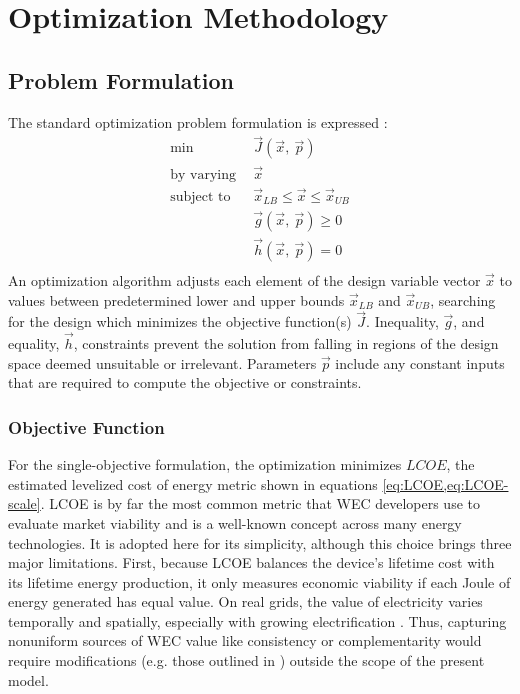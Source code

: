 \section{Optimization Methodology}\label{sec:optim-methods}
\subsection{Problem Formulation}\label{sec:formulation}
The standard optimization problem formulation is expressed \cite{martins_engineering_2022,papalambros_principles_2017}:
\begin{equation}
\begin{aligned}
    \text{min}~~& \vec{J}(\vec{x},~\vec{p}) \\
    \text{by varying}~~&\vec{x} \\
    \text{subject to}~~ &\vec{x}_{LB} \leq \vec{x} \leq \vec{x}_{UB} \\
    &\vec{g}(\vec{x},~\vec{p}) \geq 0\\
    &\vec{h}(\vec{x},~\vec{p})= 0\\
\label{standard}
\end{aligned}
\end{equation}
An optimization algorithm adjusts each element of the design variable vector $\vec{x}$ to values between predetermined lower and upper bounds $\vec{x}_{LB}$ and $\vec{x}_{UB}$, searching for the design which minimizes the objective function(s) $\vec{J}$.
Inequality, $\vec{g}$, and equality, $\vec{h}$, constraints prevent the solution from falling in regions of the design space deemed unsuitable or irrelevant.
Parameters $\vec{p}$ include any constant inputs that are required to compute the objective or constraints.

\subsubsection{Objective Function}\label{sec:obj}
For the single-objective formulation, the optimization minimizes $LCOE$, the estimated levelized cost of energy metric shown in equations \eqref{eq:LCOE,eq:LCOE-scale}.
LCOE is by far the most common metric that WEC developers use to evaluate market viability \cite{trueworthy_wave_2020} and is a well-known concept across many energy technologies.
It is adopted here for its simplicity, although this choice brings three major limitations.
First, because LCOE balances the device's lifetime cost with its lifetime energy production, it only measures economic viability if each Joule of energy generated has equal value.
On real grids, the value of electricity varies temporally and spatially, especially with growing electrification \cite{akdemir_opportunities_2023,bhattacharya_timing_2021,pennock_temporal_2022}.
Thus, capturing nonuniform sources of WEC value like consistency or complementarity would require modifications (e.g. those outlined in \cite{mccabe_system_2023}) outside the scope of the present model.

